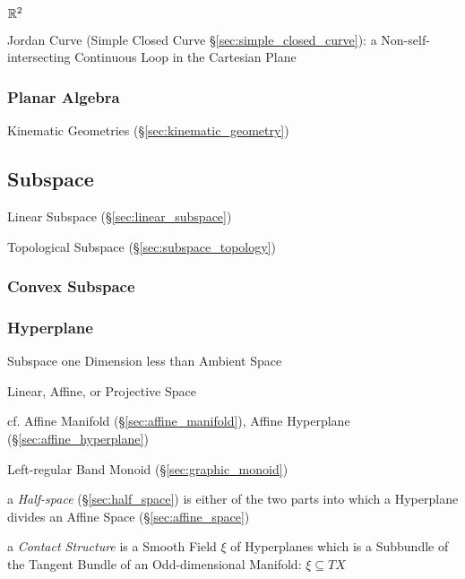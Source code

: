 $\mathbb{R}^2$

Jordan Curve (Simple Closed Curve \S\ref{sec:simple_closed_curve}): a
Non-self-intersecting Continuous Loop in the Cartesian Plane



\subsubsection{Planar Algebra}\label{sec:planar_algebra}

Kinematic Geometries (\S\ref{sec:kinematic_geometry})



\subsection{Subspace}\label{sec:subspace}


\fist Linear Subspace (\S\ref{sec:linear_subspace})

\fist Topological Subspace (\S\ref{sec:subspace_topology})



\subsubsection{Convex Subspace}\label{sec:convex_subspace}

\subsubsection{Hyperplane}\label{sec:hyperplane}

Subspace one Dimension less than Ambient Space

Linear, Affine, or Projective Space %

cf. Affine Manifold (\S\ref{sec:affine_manifold}), Affine Hyperplane
(\S\ref{sec:affine_hyperplane})

Left-regular Band Monoid (\S\ref{sec:graphic_monoid})

a \emph{Half-space} (\S\ref{sec:half_space}) is either of the two parts into
which a Hyperplane divides an Affine Space (\S\ref{sec:affine_space})

a \emph{Contact Structure} is a Smooth Field $\xi$ of Hyperplanes which is a
Subbundle of the Tangent Bundle of an Odd-dimensional Manifold: $\xi \subseteq
T X$

